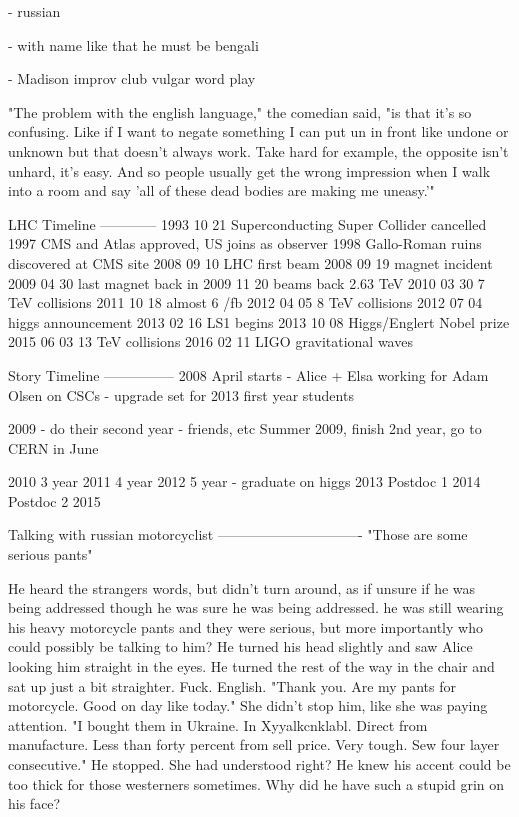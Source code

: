 - russian

- with name like that he must be bengali

- Madison improv club
 vulgar word play

"The problem with the english language," the comedian said, "is that it's so confusing. Like if I want to negate something I can put un in front like undone or unknown but that doesn't always work. Take hard for example, the opposite isn't unhard, it's easy. And so people usually get the wrong impression when I walk into a room and say 'all of these dead bodies are making me uneasy.'"







LHC Timeline
------------
1993 10 21 Superconducting Super Collider cancelled
1997 CMS and Atlas approved, US joins as observer
1998 Gallo-Roman ruins discovered at CMS site
2008 09 10 LHC first beam
2008 09 19 magnet incident
2009 04 30 last magnet back in 
2009 11 20 beams back 2.63 TeV
2010 03 30 7 TeV collisions
2011 10 18 almost 6 /fb
2012 04 05 8 TeV collisions
2012 07 04 higgs announcement
2013 02 16 LS1 begins
2013 10 08 Higgs/Englert Nobel prize
2015 06 03 13 TeV collisions
2016 02 11 LIGO gravitational waves


Story Timeline
--------------- 
2008  April starts
  - Alice + Elsa working for Adam Olsen on CSCs 
   - upgrade set for 2013
  first year students

2009 
 - do their second year
  - friends, etc
 Summer 2009, finish 2nd year, go to CERN in June

2010
 3 year
2011
 4 year
2012
 5 year - graduate on higgs
2013
 Postdoc 1
2014 
 Postdoc 2
2015


Talking with russian motorcyclist
-------------------------------
"Those are some serious pants"

He heard the strangers words, but didn't turn around, as if unsure if he was being addressed though he was sure he was being addressed. he was still wearing his heavy motorcycle pants and they were serious, but more importantly who could possibly be talking to him? He turned his head slightly and saw Alice looking him straight in the eyes. He turned the rest of the way in the chair and sat up just a bit straighter. Fuck. English.
"Thank you. Are my pants for motorcycle. Good on day like today." She didn't stop him, like she was paying attention. "I bought them in Ukraine. In Xyyalkcnklabl. Direct from manufacture. Less than forty percent from sell price. Very tough. Sew four layer consecutive." He stopped. She had understood right? He knew his accent could be too thick for those westerners sometimes. Why did he have such a stupid grin on his face?

